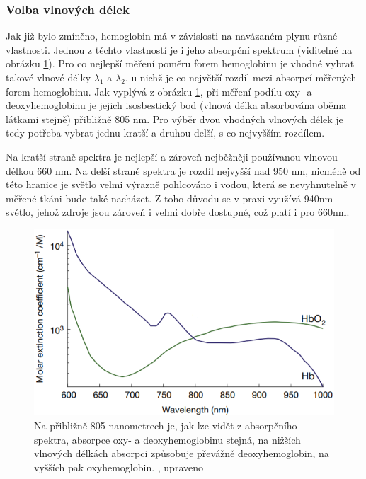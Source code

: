 \subsubsection{Volba vlnových délek}
Jak již bylo zmíněno, hemoglobin má v závislosti na navázaném plynu různé vlastnosti. Jednou z těchto vlastností je i jeho absorpční spektrum (viditelné na obrázku \ref{fig:Absorpce}). Pro co nejlepší měření poměru forem hemoglobinu je vhodné vybrat takové vlnové délky $\lambda_1$ a $\lambda_2$, u nichž je co největší rozdíl mezi absorpcí měřených forem hemoglobinu. Jak vyplývá z obrázku \ref{fig:Absorpce}, při měření podílu oxy- a deoxyhemoglobinu je jejich isosbestický bod (vlnová délka absorbována oběma látkami stejně) přibližně 805 nm. Pro výběr dvou vhodných vlnových délek je tedy potřeba vybrat jednu kratší a druhou delší, s co nejvyšším rozdílem.
\par Na kratší straně spektra je nejlepší a zároveň nejběžněji používanou vlnovou délkou 660 nm. Na delší straně spektra je rozdíl nejvyšší nad 950 nm, nicméně od této hranice je světlo velmi výrazně pohlcováno i vodou, která se nevyhnutelně v měřené tkáni bude také nacházet. Z toho důvodu se v praxi využívá 940nm světlo, jehož zdroje jsou zároveň i velmi dobře dostupné, což platí i pro 660nm. \citep{KYRIACOU}
\begin{figure}[ht]
  \includegraphics[scale=1, center]{Kapitoly/Teoreticka/Obrazky/Absorpce.png}
  \caption [Absorpční spektrum Hb a Hb$O_2$]{Na přibližně 805 nanometrech je, jak lze vidět z absorpčního spektra, absorpce oxy- a deoxyhemoglobinu stejná, na nižších vlnových délkách absorpci způsobuje převážně deoxyhemoglobin, na vyšších pak oxyhemoglobin. \citep{KYRIACOU}, upraveno}
  \label{fig:Absorpce}
\end{figure}

